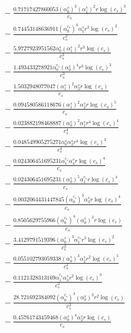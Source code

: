 \documentclass[10pt]{article}
\begin{document}
\begin{align*}
&{}  - \frac{0.71717427860053 \left(\alpha_{0}^s\right)^{3} \left(\alpha_{1}^s\right)^{2} r \log{\left(c_{s} \right)}^{3}}{c_{s}} \\
&{}  - \frac{0.74453148636911 \left(\alpha_{0}^{c_s}\right)^{4} \alpha_{1}^s r^{2} \log{\left(c_{s} \right)}^{2}}{c_{s}^{2}} \\
&{}  - \frac{5.9727923951562 \alpha_{0}^s \left(\alpha_{1}^s\right)^{2} r^{3} \log{\left(c_{s} \right)}}{c_{s}^{3}} \\
&{}  - \frac{1.493433278921 \alpha_{0}^{c_s} \left(\alpha_{0}^s\right)^{4} r^{3} \log{\left(c_{s} \right)}^{3}}{c_{s}^{3}} \\
&{}  - \frac{1.5032948077047 \left(\alpha_{1}^s\right)^{2} \alpha_{2}^s r \log{\left(c_{s} \right)}}{c_{s}} \\
&{}  - \frac{0.094580586118676 \left(\alpha_{1}^s\right)^{2} \alpha_{2}^s r \log{\left(c_{s} \right)}^{5}}{c_{s}} \\
&{}  - \frac{0.023882198468887 \left(\alpha_{0}^s\right)^{2} \alpha_{1}^s r^{4} \log{\left(c_{s} \right)}^{4}}{c_{s}^{4}} \\
&{}  - \frac{0.048549905275271 \alpha_{0}^s \alpha_{2}^s r^{4} \log{\left(c_{s} \right)}^{3}}{c_{s}^{4}} \\
&{}  - \frac{0.024306451695231 \alpha_{1}^{c_s} \alpha_{4}^s r \log{\left(c_{s} \right)}^{4}}{c_{s}} \\
&{}  - \frac{0.024306451695231 \left(\alpha_{0}^s\right)^{5} \alpha_{1}^{c_s} r \log{\left(c_{s} \right)}^{4}}{c_{s}} \\
&{}  - \frac{0.0032064431447845 \left(\alpha_{0}^{c_s}\right)^{3} \alpha_{3}^s r \log{\left(c_{s} \right)}^{4}}{c_{s}} \\
&{}  - \frac{0.8505629755966 \left(\alpha_{0}^{c_s}\right)^{4} \left(\alpha_{0}^s\right)^{3} r \log{\left(c_{s} \right)}}{c_{s}} \\
&{}  - \frac{3.4129791519396 \left(\alpha_{0}^s\right)^{3} \alpha_{1}^{c_s} r^{3} \log{\left(c_{s} \right)}^{2}}{c_{s}^{3}} \\
&{}  - \frac{0.055102793059338 \left(\alpha_{0}^s\right)^{3} \alpha_{2}^s r^{2} \log{\left(c_{s} \right)}^{5}}{c_{s}^{2}} \\
&{}  - \frac{0.1121328313169 \alpha_{1}^{c_s} \alpha_{3}^s r^{2} \log{\left(c_{s} \right)}^{3}}{c_{s}^{2}} \\
&{}  - \frac{28.721692384092 \left(\alpha_{0}^{c_s}\right)^{3} \left(\alpha_{0}^s\right)^{3} r^{2} \log{\left(c_{s} \right)}}{c_{s}^{2}} \\
&{}  - \frac{0.45761743459468 \left(\alpha_{0}^s\right)^{4} \alpha_{2}^s r \log{\left(c_{s} \right)}}{c_{s}} \\

\end{align*}
\end{document}
